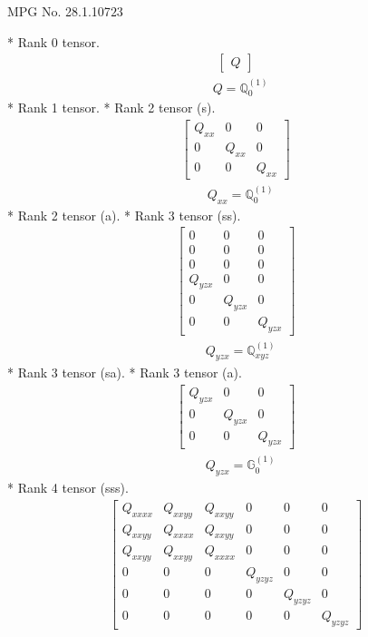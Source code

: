 \documentclass[fleqn,8pt,landscape]{jsarticle}
\begin{document}
\setcounter{MaxMatrixCols}{32}

\renewcommand{\tablename}{Table~}
\renewcommand{\figurename}{Figure~}
\begin{center}
\LARGE
MPG No. 28.1.107\quad$23$
\end{center}
* Rank 0 tensor.
\begin{align*}
\begin{bmatrix} Q \end{bmatrix}
\end{align*}
\begin{align*}
& Q = \mathbb{Q}_{0}^{(1)}
\end{align*}
* Rank 1 tensor.
* Rank 2 tensor (s).
\begin{align*}
\begin{bmatrix} Q_{xx} & 0 & 0 \\ 0 & Q_{xx} & 0 \\ 0 & 0 & Q_{xx} \end{bmatrix}
\end{align*}
\begin{align*}
& Q_{xx} = \mathbb{Q}_{0}^{(1)}
\end{align*}
* Rank 2 tensor (a).
* Rank 3 tensor (ss).
\begin{align*}
\begin{bmatrix} 0 & 0 & 0 \\ 0 & 0 & 0 \\ 0 & 0 & 0 \\ Q_{yzx} & 0 & 0 \\ 0 & Q_{yzx} & 0 \\ 0 & 0 & Q_{yzx} \end{bmatrix}
\end{align*}
\begin{align*}
& Q_{yzx} = \mathbb{Q}_{xyz}^{(1)}
\end{align*}
* Rank 3 tensor (sa).
* Rank 3 tensor (a).
\begin{align*}
\begin{bmatrix} Q_{yzx} & 0 & 0 \\ 0 & Q_{yzx} & 0 \\ 0 & 0 & Q_{yzx} \end{bmatrix}
\end{align*}
\begin{align*}
& Q_{yzx} = \mathbb{G}_{0}^{(1)}
\end{align*}
* Rank 4 tensor (sss).
\begin{align*}
\begin{bmatrix} Q_{xxxx} & Q_{xxyy} & Q_{xxyy} & 0 & 0 & 0 \\ Q_{xxyy} & Q_{xxxx} & Q_{xxyy} & 0 & 0 & 0 \\ Q_{xxyy} & Q_{xxyy} & Q_{xxxx} & 0 & 0 & 0 \\ 0 & 0 & 0 & Q_{yzyz} & 0 & 0 \\ 0 & 0 & 0 & 0 & Q_{yzyz} & 0 \\ 0 & 0 & 0 & 0 & 0 & Q_{yzyz} \end{bmatrix}
\end{align*}
\end{document}
